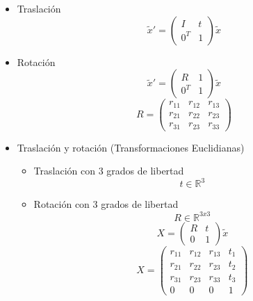 \documentclass[main.tex]{subfiles}
\begin{document}
\begin{itemize}
\item Traslación
  \begin{equation}
    {\tilde{x}}'= \begin{pmatrix}
                    I & t \\
                    0^{T} & 1 \end{pmatrix} \tilde{x}
  \end{equation}
  
\item Rotación
  \begin{equation}
    {\tilde{x}}' = \begin{pmatrix}
                     R &1 \\
                     0^{T} &1
                   \end{pmatrix}\tilde{x}  
  \end{equation}
  \begin{equation}
    R = \begin{pmatrix}
          r_{11} & r_{12}  &r_{13} \\ 
          r_{21} & r_{22}  &r_{23} \\ 
          r_{31} & r_{23}  &r_{33}
        \end{pmatrix}
  \end{equation}

\item Traslación y rotación (Transformaciones Euclidianas)
  \begin{itemize}
  \item Traslación con 3 grados de libertad
    \begin{equation}
      t \in \mathbb{R}^{3}
    \end{equation}
  \item Rotación con 3 grados de libertad
    \begin{equation}
      R \in \mathbb{R}^{3x3}
    \end{equation}
    \begin{equation}
      X = \begin{pmatrix}
            R & t \\
            0 & 1 \end{pmatrix} \tilde{x}
    \end{equation}
    \begin{equation}
      X = \begin{pmatrix}
            r_{11} & r_{12}  & r_{13} & t_{1}\\ 
            r_{21} & r_{22}  & r_{23} & t_{2}\\ 
            r_{31} & r_{23}  & r_{33} & t_{3}\\
            0      & 0       & 0      & 1
          \end{pmatrix}
    \end{equation}
  \end{itemize}
\end{itemize}
\end{document}
